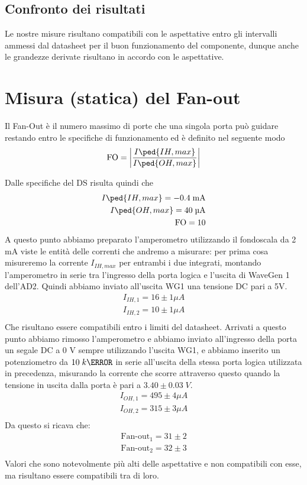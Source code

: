\documentclass[10pt, a4paper, italian]{article}
\begin{document}
\subsection{Confronto dei risultati}
Le nostre misure risultano compatibili con le aspettative entro gli intervalli
ammessi dal datasheet per il buon funzionamento del componente, dunque anche
le grandezze derivate risultano in accordo con le aspettative.

\section{Misura (statica) del Fan-out}
Il Fan-Out è il numero massimo di porte che una singola porta può guidare
restando entro le specifiche di funzionamento ed è definito nel seguente modo
\[
\text{FO}= \abs{\frac{I\ped{IH, max}}{I\ped{OH, max}}}
\]

Dalle specifiche del DS risulta quindi che 
\begin{align*}
    I\ped{IH, max}= -0.4 \; \si{m\A} \\
    I\ped{OH, max}= 40 \; \si{\micro\A} \\
    \text{FO} = 10
\end{align*}
A questo punto abbiamo preparato l'amperometro utilizzando il fondoscala da 2 mA viste le entità delle correnti che andremo a misurare: per prima cosa misureremo la corrente $I_{IH,max}$ per entrambi i due integrati, montando l'amperometro in serie tra l'ingresso della porta logica e l'uscita di WaveGen 1 dell'AD2. Quindi abbiamo inviato all'uscita WG1 una tensione DC pari a 5V.
\begin{gather*}
    I_{IH,1}=16 \pm 1 \mu A\\
    I_{IH,2}=10 \pm 1 \mu A\\   
\end{gather*}
Che risultano essere compatibili entro i limiti del datasheet.
Arrivati a questo punto abbiamo rimosso l'amperometro e abbiamo inviato all'ingresso della porta un segale DC a 0 V sempre utilizzando l'uscita WG1, e abbiamo inserito un potenziometro da $10 \; k\ohm$ in serie all'uscita della stessa porta logica utilizzata in precedenza, misurando la corrente che scorre attraverso questo quando la tensione in uscita dalla porta è pari a $3.40 \pm 0.03 \; V$.
\begin{gather*}
    I_{OH,1}=495 \pm 4 \mu A\\
    I_{OH,2}=315 \pm 3 \mu A\\   
\end{gather*}
Da questo si ricava che:
\begin{gather*}
    \mbox{Fan-out}_1=31 \pm 2\\
    \mbox{Fan-out}_2=32 \pm 3\\
\end{gather*}
Valori che sono notevolmente più alti delle aspettative e non compatibili con esse, ma risultano essere compatibili tra di loro.
\end{document}
